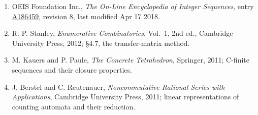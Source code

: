\documentclass[11pt]{article}
\theoremstyle{definition}
\begin{document}
\begin{enumerate}

\item OEIS Foundation Inc., \emph{The On-Line Encyclopedia of Integer Sequences}, entry \href{https://oeis.org/A186459}{A186459}, revision 8, last modified Apr 17 2018.

\item R. P. Stanley, \emph{Enumerative Combinatorics}, Vol.~1, 2nd ed., Cambridge University Press, 2012; \S4.7, the transfer-matrix method.

\item M. Kauers and P. Paule, \emph{The Concrete Tetrahedron}, Springer, 2011; C-finite sequences and their closure properties.

\item J. Berstel and C. Reutenauer, \emph{Noncommutative Rational Series with Applications}, Cambridge University Press, 2011; linear representations of counting automata and their reduction.

\end{enumerate}
\end{document}
